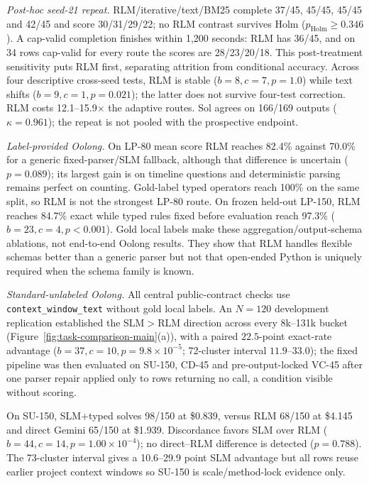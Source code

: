 \documentclass[letterpaper]{article}
\begin{document}
\emph{Post-hoc seed-21 repeat.} RLM/iterative/text/BM25 complete 37/45, 45/45, 45/45 and 42/45 and score 30/31/29/22; no RLM contrast survives Holm ($p_{\mathrm{Holm}}\geq0.346$). A cap-valid completion finishes within 1,200 seconds: RLM has 36/45, and on 34 rows cap-valid for every route the scores are 28/23/20/18. This post-treatment sensitivity puts RLM first, separating attrition from conditional accuracy. Across four descriptive cross-seed tests, RLM is stable ($b{=}8,c{=}7,p{=}1.0$) while text shifts ($b{=}9,c{=}1,p{=}0.021$); the latter does not survive four-test correction. RLM costs 12.1--15.9$\times$ the adaptive routes. Sol agrees on 166/169 outputs ($\kappa{=}0.961$); the repeat is not pooled with the prospective endpoint.

\emph{Label-provided Oolong.} On LP-80 mean score RLM reaches 82.4\% against 70.0\% for a generic fixed-parser/SLM fallback, although that difference is uncertain ($p{=}0.089$); its largest gain is on timeline questions and deterministic parsing remains perfect on counting. Gold-label typed operators reach 100\% on the same split, so RLM is not the strongest LP-80 route. On frozen held-out LP-150, RLM reaches 84.7\% exact while typed rules fixed before evaluation reach 97.3\% ($b{=}23,c{=}4,p{<}0.001$). Gold local labels make these aggregation/output-schema ablations, not end-to-end Oolong results. They show that RLM handles flexible schemas better than a generic parser but not that open-ended Python is uniquely required when the schema family is known.

\emph{Standard-unlabeled Oolong.} All central public-contract checks use \texttt{context\_window\_text} without gold local labels. An $N{=}120$ development replication established the SLM$>$RLM direction across every 8k--131k bucket (Figure~\ref{fig:task-comparison-main}(a)), with a paired $22.5$-point exact-rate advantage ($b{=}37,c{=}10,p{=}9.8{\times}10^{-5}$; 72-cluster interval $11.9$--$33.0$); the fixed pipeline was then evaluated on SU-150, CD-45 and pre-output-locked VC-45 after one parser repair applied only to rows returning no call, a condition visible without scoring.

On SU-150, SLM+typed solves 98/150 at \$0.839, versus RLM 68/150 at \$4.145 and direct Gemini 65/150 at \$1.939. Discordance favors SLM over RLM ($b{=}44,c{=}14,p{=}1.00{\times}10^{-4}$); no direct--RLM difference is detected ($p{=}0.788$). The 73-cluster interval gives a 10.6--29.9 point SLM advantage but all rows reuse earlier project context windows so SU-150 is scale/method-lock evidence only.
\end{document}
